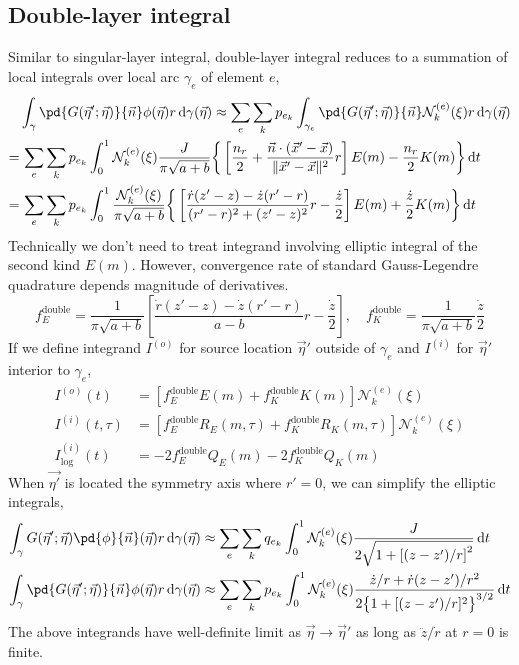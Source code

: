 \documentclass{jfm}
\begin{document}
\subsection{Double-layer integral}
Similar to singular-layer integral, double-layer integral reduces to a summation of local integrals over local arc $\gamma_e$ of element $e$,
\begin{align}
&\nonumber\int_{\gamma}\pd{G(\vec{\eta}';\vec{\eta})}{\vec{n}}\phi(\vec{\eta}) r \,\mathrm{d}\gamma(\vec{\eta})
\approx\sum_e \sum_k p_{e_k}
\int_{\gamma_e}\pd{G(\vec{\eta}';\vec{\eta})}{\vec{n}}\mathcal{N}^{(e)}_k(\xi) r \,\mathrm{d}\gamma(\vec{\eta})\\
=&\nonumber\,\sum_e \sum_k p_{e_k}
\int_0^1\mathcal{N}^{(e)}_k(\xi)
\frac{J}{\pi \sqrt{a+b}}\bigg\{
\left[\frac{n_r}{2}+\frac{\vec{n}\cdot(\vec{x}'-\vec{x})}{\|\vec{x}'-\vec{x}\|^2}r\right]E(m)
-\frac{n_r}{2}K(m)\bigg\}
\,\mathrm{d}t\\
=&\,\sum_e \sum_k p_{e_k}
\int_0^1
\frac{\mathcal{N}^{(e)}_k(\xi)}{\pi \sqrt{a+b}}\bigg\{
\left[\frac{\dot{r}(z'-z)-\dot{z}(r'-r)}{(r'-r)^2+(z'-z)^2}r
-\frac{\dot{z}}{2}\right]E(m)
+\frac{\dot{z}}{2}K(m)\bigg\}
\,\mathrm{d}t
\end{align}
Technically we don't need to treat integrand involving elliptic integral of the second kind $E(m)$.
However, convergence rate of standard Gauss-Legendre quadrature  depends magnitude of derivatives.
\begin{equation}
f_E^\mathrm{double}=\frac{1}{\pi \sqrt{a+b}}
\left[\frac{\dot{r}(z'-z)-\dot{z}(r'-r)}{a-b}r
-\frac{\dot{z}}{2}\right],\quad
f_K^\mathrm{double}=\frac{1}{\pi \sqrt{a+b}}
\frac{\dot{z}}{2}
\end{equation}
If we define integrand $I^{(o)}$ for source location $\vec{\eta}'$ outside of $\gamma_e$
and $I^{(i)}$ for $\vec{\eta}'$ interior to $\gamma_e$,
\begin{align}
I^{(o)}(t) &= \left[ f_E^\mathrm{double} E(m)+f_K^\mathrm{double} K(m)\right]\mathcal{N}^{(e)}_k(\xi)\\
I^{(i)}(t,\tau) &= \left[f_E^\mathrm{double}R_E(m,\tau)+ f_K^\mathrm{double}R_K(m,\tau)\right]\mathcal{N}^{(e)}_k(\xi)\\
I^{(i)}_\mathrm{log}(t) &=-2 f_E^\mathrm{double}Q_E(m) -2 f_K^\mathrm{double}Q_K(m) 
\end{align}
When $\vec{\eta'}$ is located the symmetry axis where $r'=0$,
we can simplify the elliptic integrals,
\begin{align}
\int_{\gamma}G(\vec{\eta}';\vec{\eta})
\pd{\phi}{\vec{n}}(\vec{\eta}) r \,\mathrm{d}\gamma(\vec{\eta})
&\approx\sum_e \sum_k q_{e_k}
\int_0^1\mathcal{N}^{(e)}_k(\xi)\frac{   J }{
2 \sqrt{1+\left[(z-z')/r\right]^2}}\,\mathrm{d}t\\
\int_{\gamma}\pd{G(\vec{\eta}';\vec{\eta})}{\vec{n}}\phi(\vec{\eta}) r \,\mathrm{d}\gamma(\vec{\eta})
&\approx\sum_e \sum_k p_{e_k}
\int_0^1\mathcal{N}^{(e)}_k(\xi) \frac{  
\dot{z}/r+\dot{r}(z-z')/r^2
}{
2\big\{1+[(z-z')/r]^2\big\}^{3/2}
}\,\mathrm{d}t
\end{align}
The above integrands have well-definite limit as $\vec{\eta}\to\vec{\eta}'$
as long as $\ddot{z}/\dot{r}$ at $r=0$ is finite.
\end{document}

